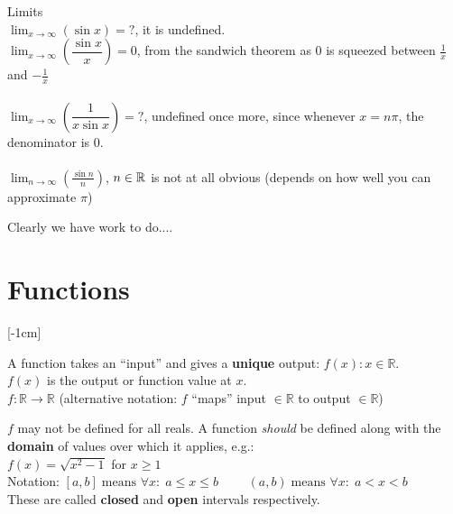 \begin{example}
Limits\\

$\displaystyle{\lim_{x \to \infty} (\sin x) = ? }$, it is undefined.\\

$\displaystyle{\lim_{x \to \infty} \left(\dfrac{\sin x}{x}\right) }= 0 $, from the sandwich theorem as 0 is squeezed between $\frac{1}{x}$ and $-\frac{1}{x}$\\\\

$\displaystyle{\lim_{x \to \infty} \left(\dfrac{1}{x\sin x}\right) = ? }$, undefined once more, since whenever $x = n\pi$, the denominator is 0.\\\\

$\displaystyle{\lim_{n \to \infty} \left(\frac{\sin n}{n}\right) }$, $n \in \mathbb{R}$ is not at all obvious (depends on how well you can approximate $\pi$)\\
\end{example}

Clearly we have work to do....




\pagebreak


\section{Functions}   [-1cm]
       
A function takes an ``input'' and gives a \textbf{unique} output: $f(x) : x \in \mathbb{R}.$\\$f(x)$ is the output or function value at $x$.\\

$f:\mathbb{R} \rightarrow \mathbb{R}$ (alternative notation: $f$ ``maps'' input $\in \mathbb{R}$ to output $\in \mathbb{R}$)

$f$ may not be defined for all reals. A function \textit{should} be defined along with the \textbf{domain} of values over which it applies, e.g.:\\

$f(x) = \sqrt{x^2 -1}$ for $ x \geq 1$\\

Notation: $[a,b] \; \text{means } \forall x : \; a \leq x \leq b \qquad$
$(a,b) \; \text{means } \forall x : \; a < x < b$ \\
These are called \textbf{closed} and \textbf{open} intervals respectively. 

